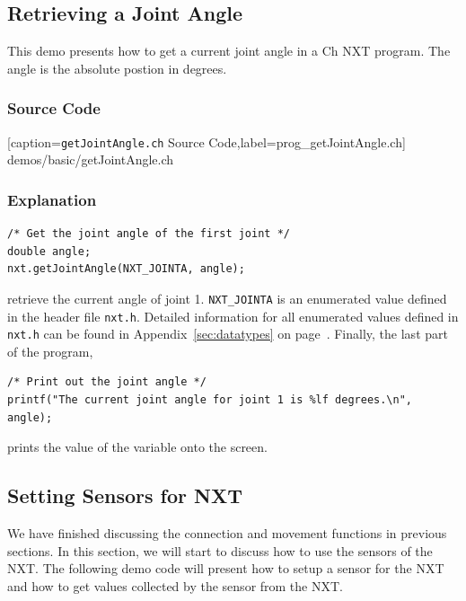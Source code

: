 \documentclass[11pt]{article}
\begin{document}
\subsection{Retrieving a Joint Angle}
This demo presents how to get a current joint angle in a Ch NXT program. The 
angle is the absolute postion in degrees.

\subsubsection*{Source Code}

[caption={{\tt getJointAngle.ch} Source Code},label=prog_getJointAngle.ch]
{demos/basic/getJointAngle.ch}

\subsubsection*{Explanation}

\begin{lstlisting}
/* Get the joint angle of the first joint */
double angle;
nxt.getJointAngle(NXT_JOINTA, angle);
\end{lstlisting}
retrieve the current angle of joint 1. {\tt NXT\_JOINTA} is an enumerated 
value defined in the header file {\tt nxt.h}. Detailed information for all 
enumerated values defined in {\tt nxt.h} can be found in 
Appendix~\ref{sec:datatypes} on page~\pageref{sec:datatypes}. Finally, the 
last part of the program,
\begin{lstlisting}
/* Print out the joint angle */
printf("The current joint angle for joint 1 is %lf degrees.\n", angle);
\end{lstlisting}
prints the value of the variable onto the screen.

\subsection{\label{setSensor_demo}Setting Sensors for NXT}
We have finished discussing the connection and movement functions in previous 
sections. In this section, we will start to discuss how to use the sensors of 
the NXT. The following demo code will present how to setup a sensor for the NXT 
and how to get values collected by the sensor from the NXT.
\end{document}
